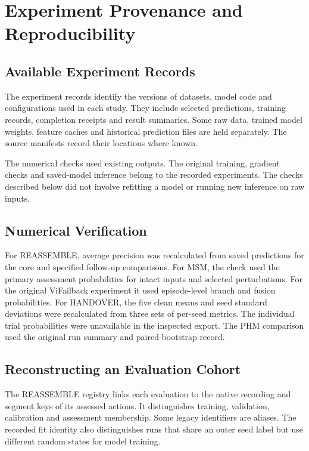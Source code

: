 \chapter{Experiment Provenance and Reproducibility}
\label{app:reproducibility}

\section{Available Experiment Records}
The experiment records identify the versions of datasets, model code and configurations
used in each study. They include selected predictions, training records, completion
receipts and result summaries. Some raw data, trained model weights, feature caches and
historical prediction files are held separately. The source manifests record their
locations where known.

The numerical checks used existing outputs. The original training, gradient checks and
saved-model inference belong to the recorded experiments. The checks described below did
not involve refitting a model or running new inference on raw inputs.

\section{Numerical Verification}
For REASSEMBLE, average precision was recalculated from saved predictions for the core
and specified follow-up comparisons. For MSM, the check used the primary assessment
probabilities for intact inputs and selected perturbations. For the original ViFailback
experiment it used episode-level branch and fusion probabilities. For HANDOVER, the five
clean means and seed standard deviations were recalculated from three sets of per-seed
metrics. The individual trial probabilities were unavailable in the inspected export.
The PHM comparison used the original run summary and paired-bootstrap record.

\section{Reconstructing an Evaluation Cohort}
The REASSEMBLE registry links each evaluation to the native recording and segment keys
of its assessed actions. It distinguishes training, validation, calibration and
assessment membership. Some legacy identifiers are aliases. The recorded fit identity
also distinguishes runs that share an outer seed label but use different random states
for model training.

